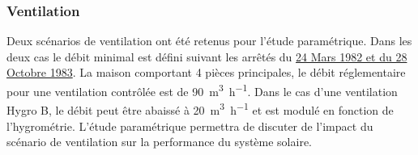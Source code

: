 \subsubsection{Ventilation} %
\label{ssub:ventilation}

Deux scénarios de ventilation ont été retenus pour l’étude paramétrique. Dans les deux cas
le débit minimal est défini suivant les arrêtés du
\href{https://www.legifrance.gouv.fr/affichTexte.do?cidTexte=JORFTEXT000000862344}{24 Mars
1982 et du 28 Octobre 1983}. La maison comportant 4 pièces principales, le débit réglementaire
pour une ventilation contrôlée est de \SI{90}{\meter\cubed\per\hour}. Dans le cas d’une ventilation
Hygro B, le débit peut être abaissé à \SI{20}{\meter\cubed\per\hour} et est modulé en fonction
de l’hygrométrie. L’étude paramétrique permettra de discuter de l’impact du scénario
de ventilation sur la performance du système solaire.











